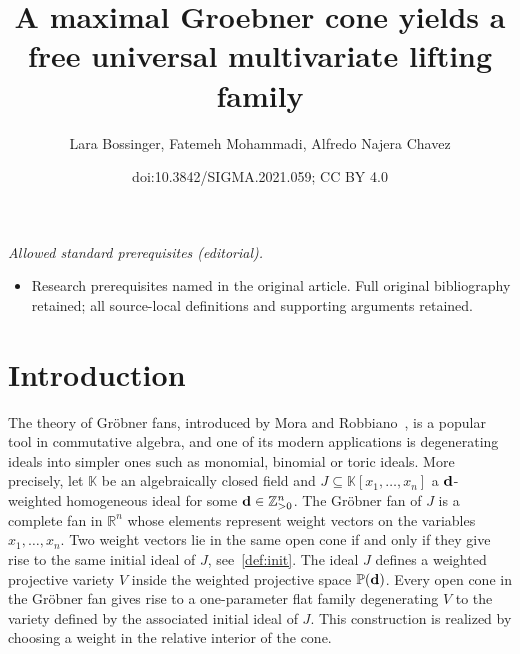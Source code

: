 \documentclass[10pt,a4paper]{amsart}
\title{A maximal Groebner cone yields a free universal multivariate lifting family}
\author{Lara Bossinger, Fatemeh Mohammadi, Alfredo Najera Chavez}
\date{doi:10.3842/SIGMA.2021.059; CC BY 4.0}
\newcommand{\thref}[1]{\ref{#1}}
\numberwithin{equation}{section}
\begin{document}
\maketitle
\noindent\textit{Allowed standard prerequisites (editorial).}\begin{itemize}
\item Research prerequisites named in the original article. Full original bibliography retained; all source-local definitions and supporting arguments retained.
\end{itemize}\medskip
\section{Introduction}%

The theory of Gr\"obner fans, introduced by Mora and Robbiano~\cite{mora1988grobner}, is a popular tool in commutative algebra, and one of its modern applications is degenerating ideals into simpler ones such as monomial, binomial or toric ideals.
More precisely, let $\mathbb K$ be an algebraically closed field and $J\subseteq \mathbb{K}[x_1,\dots,x_n]$ a ${\bf d}$-weighted homogeneous ideal for some ${\bf d}\in \mathbb Z_{>0}^n$.
The Gr\"obner fan of $J$ is a complete fan in $\mathbb{R}^n$ whose elements represent weight vectors on the variables $x_1,\dots,x_n$.
Two weight vectors lie in the same open cone if and only if they give rise to the same initial ideal of $J$, see~\thref{def:init}.
The ideal $J$ defines a weighted projective variety $V$ inside the weighted projective space $\mathbb P({\bf d})$.
Every open cone in the Gr\"obner fan gives rise to a one-parameter flat family degenerating $V$ to the variety defined by the associated initial ideal of $J$.
This construction is realized by choosing a weight in the relative interior of the cone.
\end{document}
